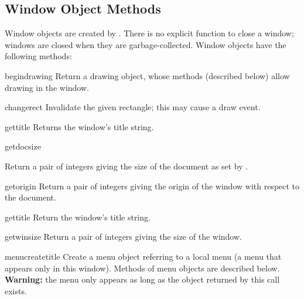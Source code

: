 \subsection{Window Object Methods}

Window objects are created by
.
There is no explicit function to close a window; windows are closed when
they are garbage-collected.
Window objects have the following methods:

\renewcommand{\indexsubitem}{(window method)}
\begin{funcdesc}{begindrawing}{}
Return a drawing object, whose methods (described below) allow drawing
in the window.
\end{funcdesc}

\begin{funcdesc}{change}{rect}
Invalidate the given rectangle; this may cause a draw event.
\end{funcdesc}

\begin{funcdesc}{gettitle}{}
Returns the window's title string.
\end{funcdesc}

\begin{funcdesc}{getdocsize}{}
\begin{sloppypar}
Return a pair of integers giving the size of the document as set by
.
\end{sloppypar}
\end{funcdesc}

\begin{funcdesc}{getorigin}{}
Return a pair of integers giving the origin of the window with respect
to the document.
\end{funcdesc}

\begin{funcdesc}{gettitle}{}
Return the window's title string.
\end{funcdesc}

\begin{funcdesc}{getwinsize}{}
Return a pair of integers giving the size of the window.
\end{funcdesc}

\begin{funcdesc}{menucreate}{title}
Create a menu object referring to a local menu (a menu that appears
only in this window).
Methods of menu objects are described below.
{\bf Warning:} the menu only appears as long as the object
returned by this call exists.
\end{funcdesc}

